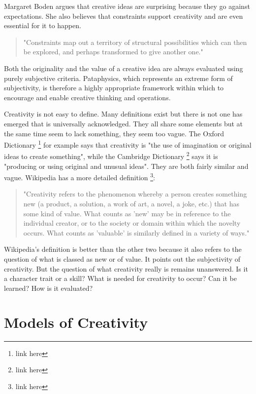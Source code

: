 Margaret Boden \citep{Boden2003} argues that creative ideas are surprising because they go against expectations. She also believes that constraints support creativity and are even essential for it to happen.

\begin{quote}
  "Constraints map out a territory of structural possibilities which can then be explored, and perhaps transformed to give another one."\citep{Boden2003}
\end{quote}

Both the originality and the value of a creative idea are always evaluated using purely subjective criteria. Pataphysics, which represents an extreme form of subjectivity, is therefore a highly appropriate framework within which to encourage and enable creative thinking and operations.

Creativity is not easy to define. Many definitions exist but there is not one has emerged that is universally acknowledged. They all share some elements but at the same time seem to lack something, they seem too vague. The Oxford Dictionary \footnote{link here} for example says that creativity is "the use of imagination or original ideas to create something", while the Cambridge Dictionary \footnote{link here} says it is "producing or using original and unusual ideas". They are both fairly similar and vague. Wikipedia has a more detailed definition \footnote{link here}:

\begin{quote}
  "Creativity refers to the phenomenon whereby a person creates something new (a product, a solution, a work of art, a novel, a joke, etc.) that has some kind of value. What counts as 'new' may be in reference to the individual creator, or to the society or domain within which the novelty occurs. What counts as 'valuable' is similarly defined in a variety of ways."
\end{quote}

Wikipedia's definition is better than the other two because it also refers to the question of what is classed as new or of value. It points out the subjectivity of creativity. But the question of what creativity really is remains unanswered. Is it a character trait or a skill? What is needed for creativity to occur? Can it be learned? How is it evaluated?


\section{Models of Creativity}

